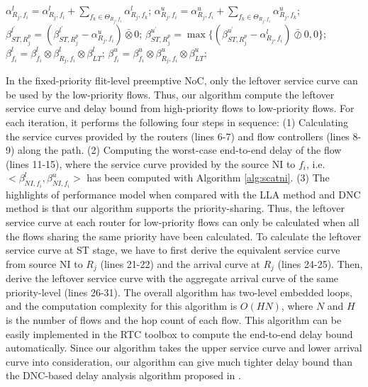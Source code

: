 \documentclass[preprint]{elsarticle}
\begin{document}
\begin{algorithm}
\begin{algorithmic}[1]
                    \State $\alpha^l_{R_j,f_i}=\alpha^l_{R_j,f_i}+\sum_{f_k\in\Theta_{R_j,f_i}}\alpha^l_{R_j,f_k}$;
                    \State $\alpha^u_{R_j,f_i}=\alpha^u_{R_j,f_i}+\sum_{f_k\in\Theta_{R_j,f_i}}\alpha^u_{R_j,f_k}$;
                    \State $\beta^{l^\prime}_{ST,R_j^{p}}=(\beta^{l^\prime}_{ST,R_j^{p}}-\alpha^u_{R_j,f_i})\bar{\otimes}0$;
                    \State $\beta^{u^\prime}_{ST,R_j^{p}}=\max\{(\beta^{u^\prime}_{ST,R_j^{p}}-\alpha^l_{R_j,f_i})\bar{\oslash}0,0\}$;
                \EndIf
            \EndIf
            \State $\beta_{f_i}^l=\beta_{f_i}^l\otimes\beta^l_{R_j,f_i}\otimes\beta^l_{LT}$;
            \State $\beta_{f_i}^u=\beta_{f_i}^u\otimes\beta^u_{R_j,f_i}\otimes\beta^u_{LT}$;
        \EndFor
    \EndFor
\end{algorithmic}
\end{algorithm}

In the fixed-priority flit-level preemptive NoC, only the leftover service curve can be used by the low-priority flows. Thus, our algorithm compute the leftover service curve and delay bound from high-priority flows to low-priority flows. For each iteration, it performs the following four steps in sequence: (1) Calculating the service curves provided by the routers (lines 6-7) and flow controllers (lines 8-9) along the path. (2) Computing the worst-case end-to-end delay of the flow (lines 11-15), where the service curve provided by the source NI to $f_i$, i.e. $<\beta_{NI,f_i}^l,\beta_{NI,f_i}^u>$ has been computed with Algorithm \ref{alg:scatni}. (3) The highlights of performance model when compared with the LLA method \cite{73} and DNC method \cite{Qian489900} is that our algorithm supports the priority-sharing. Thus, the leftover service curve at each router for low-priority flows can only be calculated when all the flows sharing the same priority have been calculated. To calculate the leftover service curve at ST stage, we have to first derive the equivalent service curve from source NI to $R_j$ (lines 21-22) and the arrival curve at $R_j$ (lines 24-25). Then, derive the leftover service curve with the aggregate arrival curve of the same priority-level (lines 26-31). The overall algorithm has two-level embedded loops, and the computation complexity for this algorithm is $O(HN)$, where $N$ and $H$ is the number of flows and the hop count of each flow. This algorithm can be easily implemented in the RTC toolbox \cite{rtc} to compute the end-to-end delay bound automatically. Since our algorithm takes the upper service curve and lower arrival curve into consideration, our algorithm can give much tighter delay bound than the DNC-based delay analysis algorithm proposed in \cite{Qian489900}.
\end{document}
